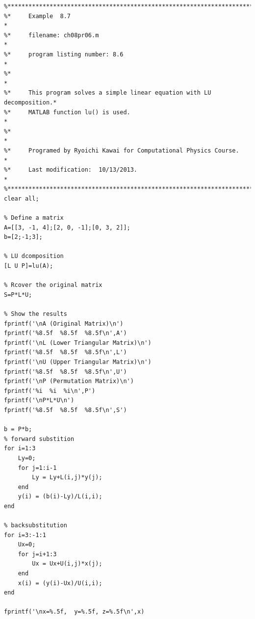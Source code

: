 \bigskip
\noindent
\program
\label{prog:LU}
\footnotesize
\begin{verbatim}
%**************************************************************************
%*     Example  8.7                                                       *
%*     filename: ch08pr06.m                                               *
%*     program listing number: 8.6                                        *
%*                                                                        *
%*     This program solves a simple linear equation with LU decomposition.*
%*     MATLAB function lu() is used.                                      *
%*                                                                        *
%*     Programed by Ryoichi Kawai for Computational Physics Course.       *
%*     Last modification:  10/13/2013.                                    *
%**************************************************************************
clear all;

% Define a matrix
A=[[3, -1, 4];[2, 0, -1];[0, 3, 2]];
b=[2;-1;3];

% LU dcomposition
[L U P]=lu(A);

% Rcover the original matrix
S=P*L*U;

% Show the results
fprintf('\nA (Original Matrix)\n')
fprintf('%8.5f  %8.5f  %8.5f\n',A')
fprintf('\nL (Lower Triangular Matrix)\n')
fprintf('%8.5f  %8.5f  %8.5f\n',L')
fprintf('\nU (Upper Triangular Matrix)\n')
fprintf('%8.5f  %8.5f  %8.5f\n',U')
fprintf('\nP (Permutation Matrix)\n')
fprintf('%i  %i  %i\n',P')
fprintf('\nP*L*U\n')
fprintf('%8.5f  %8.5f  %8.5f\n',S')

b = P*b;
% forward substition
for i=1:3
    Ly=0;
    for j=1:i-1
        Ly = Ly+L(i,j)*y(j);
    end
    y(i) = (b(i)-Ly)/L(i,i);
end

% backsubstitution
for i=3:-1:1
    Ux=0;
    for j=i+1:3
        Ux = Ux+U(i,j)*x(j);
    end
    x(i) = (y(i)-Ux)/U(i,i);
end

fprintf('\nx=%.5f,  y=%.5f, z=%.5f\n',x)
\end{verbatim}
\normalsize


